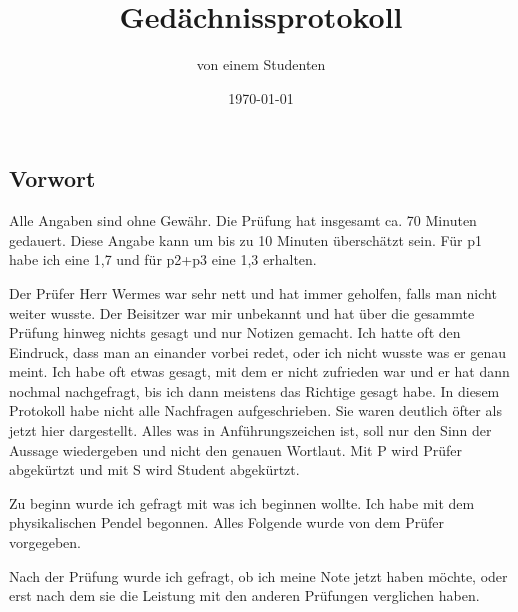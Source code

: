 \documentclass[10pt]{article}
\title{Gedächnissprotokoll}
\author{von einem Studenten}
\date{\today}
\begin{document}



\pagestyle{fancy}
\fancyhead[R]{\thepage}
\fancyhead[L]{\leftmark}

\begin{multicols}{2}
\section{Vorwort}
Alle Angaben sind ohne Gewähr. Die Prüfung hat insgesamt ca. 70 Minuten gedauert. Diese Angabe kann um bis zu 10 Minuten überschätzt sein. Für p1 habe ich eine 1,7 und für p2+p3 eine 1,3 erhalten.

Der Prüfer Herr Wermes war sehr nett und hat immer geholfen, falls man nicht weiter wusste. Der Beisitzer war mir unbekannt und hat über die gesammte Prüfung hinweg nichts gesagt und nur Notizen gemacht. Ich hatte oft den Eindruck, dass man an einander vorbei redet, oder ich nicht wusste was er genau meint. Ich habe oft etwas gesagt, mit dem er nicht zufrieden war und er hat dann nochmal nachgefragt, bis ich dann meistens das Richtige gesagt habe. In diesem Protokoll habe nicht alle Nachfragen aufgeschrieben. Sie waren deutlich öfter als jetzt hier dargestellt. Alles was in Anführungszeichen ist, soll nur den Sinn der Aussage wiedergeben und nicht den genauen Wortlaut. Mit P wird Prüfer abgekürtzt und mit S wird Student abgekürtzt.

Zu beginn wurde ich gefragt mit was ich beginnen wollte. Ich habe mit dem physikalischen Pendel begonnen. Alles Folgende wurde von dem Prüfer vorgegeben.

Nach der Prüfung wurde ich gefragt, ob ich meine Note jetzt haben möchte, oder erst nach dem sie die Leistung mit den anderen Prüfungen verglichen haben.



\end{multicols}
\end{document}
